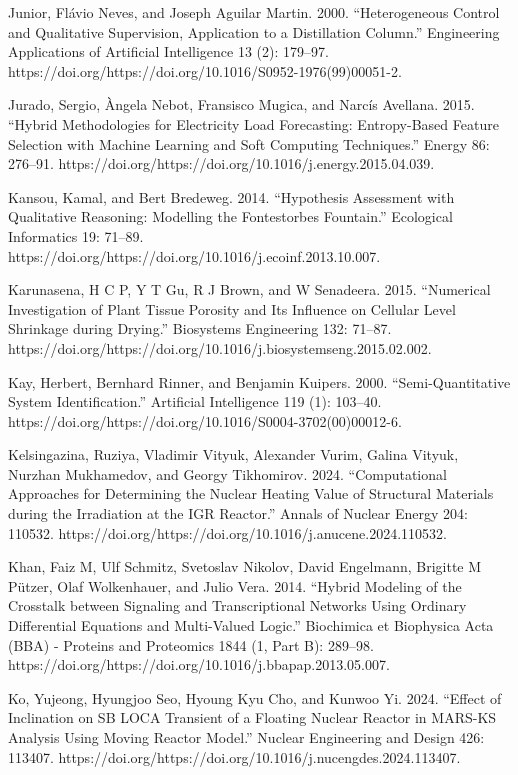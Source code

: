\documentclass[utf8]{gradu3}
\begin{document}
Junior, Flávio Neves, and Joseph Aguilar Martin. 2000. “Heterogeneous Control and Qualitative Supervision, Application to a Distillation Column.” Engineering Applications of Artificial Intelligence 13 (2): 179–97. https://doi.org/https://doi.org/10.1016/S0952-1976(99)00051-2.

Jurado, Sergio, Àngela Nebot, Fransisco Mugica, and Narcís Avellana. 2015. “Hybrid Methodologies for Electricity Load Forecasting: Entropy-Based Feature Selection with Machine Learning and Soft Computing Techniques.” Energy 86: 276–91. https://doi.org/https://doi.org/10.1016/j.energy.2015.04.039.

Kansou, Kamal, and Bert Bredeweg. 2014. “Hypothesis Assessment with Qualitative Reasoning: Modelling the Fontestorbes Fountain.” Ecological Informatics 19: 71–89. https://doi.org/https://doi.org/10.1016/j.ecoinf.2013.10.007.

Karunasena, H C P, Y T Gu, R J Brown, and W Senadeera. 2015. “Numerical Investigation of Plant Tissue Porosity and Its Influence on Cellular Level Shrinkage during Drying.” Biosystems Engineering 132: 71–87. https://doi.org/https://doi.org/10.1016/j.biosystemseng.2015.02.002.

Kay, Herbert, Bernhard Rinner, and Benjamin Kuipers. 2000. “Semi-Quantitative System Identification.” Artificial Intelligence 119 (1): 103–40. https://doi.org/https://doi.org/10.1016/S0004-3702(00)00012-6.

Kelsingazina, Ruziya, Vladimir Vityuk, Alexander Vurim, Galina Vityuk, Nurzhan Mukhamedov, and Georgy Tikhomirov. 2024. “Computational Approaches for Determining the Nuclear Heating Value of Structural Materials during the Irradiation at the IGR Reactor.” Annals of Nuclear Energy 204: 110532. https://doi.org/https://doi.org/10.1016/j.anucene.2024.110532.

Khan, Faiz M, Ulf Schmitz, Svetoslav Nikolov, David Engelmann, Brigitte M Pützer, Olaf Wolkenhauer, and Julio Vera. 2014. “Hybrid Modeling of the Crosstalk between Signaling and Transcriptional Networks Using Ordinary Differential Equations and Multi-Valued Logic.” Biochimica et Biophysica Acta (BBA) - Proteins and Proteomics 1844 (1, Part B): 289–98. https://doi.org/https://doi.org/10.1016/j.bbapap.2013.05.007.

Ko, Yujeong, Hyungjoo Seo, Hyoung Kyu Cho, and Kunwoo Yi. 2024. “Effect of Inclination on SB LOCA Transient of a Floating Nuclear Reactor in MARS-KS Analysis Using Moving Reactor Model.” Nuclear Engineering and Design 426: 113407. https://doi.org/https://doi.org/10.1016/j.nucengdes.2024.113407.
\end{document}
